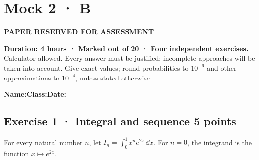 \fi

\fi

\ifprof

\clearpage{}\label{sujet:8-4}

\section*{Mock 2 · B}

{\sffamily\bfseries\color{amber}PAPER RESERVED FOR ASSESSMENT\par}

\textbf{Duration: 4 hours · Marked out of 20 · Four independent exercises.}\\Calculator allowed. Every answer must be justified; incomplete approaches will be taken into account. Give exact values; round probabilities to $10^{-6}$ and other approximations to $10^{-4}$, unless stated otherwise.

\smallskip\textbf{Name:}\enspace\dotfill\quad\textbf{Class:}\enspace\dotfill\quad\textbf{Date:}\enspace\dotfill

\subsection*{Exercise 1 · Integral and sequence \hfill 5 points}For every natural number $n$, let $I_n=\displaystyle\int_0^1x^ne^{2x}\,\dd x$. For $n=0$, the integrand is the function $x\mapsto e^{2x}$.

